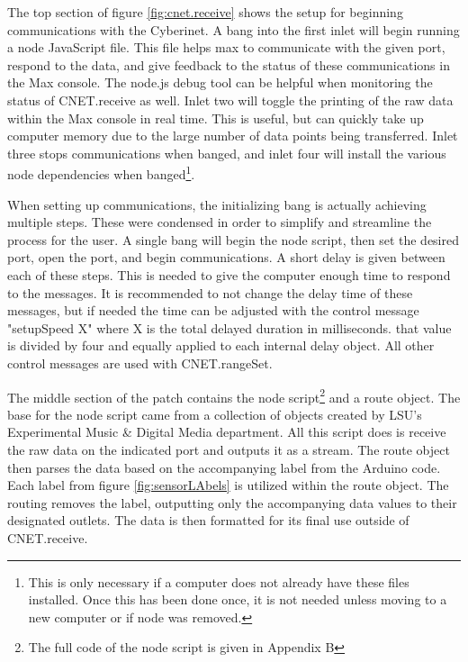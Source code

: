 The top section of figure \ref{fig:cnet.receive} shows the setup for beginning communications with the Cyberinet. A bang into the first inlet will begin running a node JavaScript file. This file helps max to communicate with the given port, respond to the data, and give feedback to the status of these communications in the Max console. The node.js debug tool can be helpful when monitoring the status of CNET.receive as well. Inlet two will toggle the printing of the raw data within the Max console in real time. This is useful, but can quickly take up computer memory due to the large number of data points being transferred. Inlet three stops communications when banged, and inlet four will install the various node dependencies when banged\footnote{This is only necessary if a computer does not already have these files installed. Once this has been done once, it is not needed unless moving to a new computer or if node was removed.}. 

When setting up communications, the initializing bang is actually achieving multiple steps. These were condensed in order to simplify and streamline the process for the user. A single bang will begin the node script, then set the desired port, open the port, and begin communications. A short delay is given between each of these steps. This is needed to give the computer enough time to respond to the messages. It is recommended to not change the delay time of these messages, but if needed the time can be adjusted with the control message "setupSpeed X" where X is the total delayed duration in milliseconds. that value is divided by four and equally applied to each internal delay object. All other control messages are used with CNET.rangeSet.

The middle section of the patch contains the node script\footnote{The full code of the node script is given in Appendix B} and a route object. The base for the node script came from a collection of objects created by LSU's Experimental Music \& Digital Media department. All this script does is receive the raw data on the indicated port and outputs it as a stream. The route object then parses the data based on the accompanying label from the Arduino code. Each label from figure \ref{fig:sensorLAbels} is utilized within the route object. The routing removes the label, outputting only the accompanying data values to their designated outlets. The data is then formatted for its final use outside of CNET.receive.

